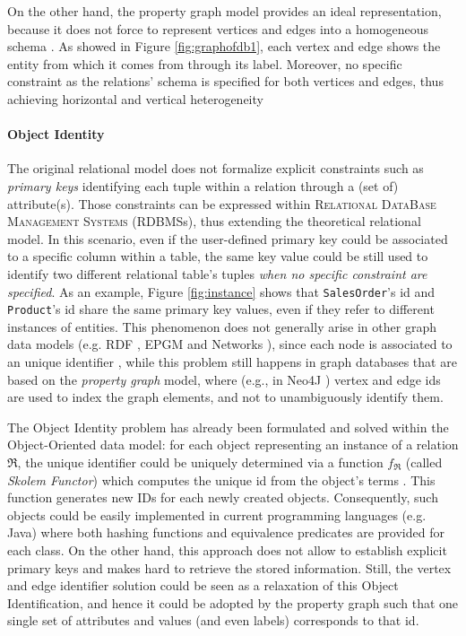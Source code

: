 On the other hand, the property graph model provides an ideal representation, because it does not force to represent vertices and edges into a homogeneous schema \cite{Vasilyeva13}. As showed in Figure \ref{fig:graphofdb1}, each vertex and edge shows the entity from which it comes from through its label. Moreover, no specific constraint as the relations' schema is specified for both vertices and edges, thus achieving horizontal and vertical heterogeneity

\paragraph*{Object Identity}\label{sec:objid}
The original relational model does not formalize explicit constraints such as \textit{primary keys} identifying each tuple within a relation through a (set of) attribute(s). Those constraints can be expressed within \textsc{Relational DataBase Management Systems} (RDBMSs), thus extending the theoretical relational model. In this scenario, even if the user-defined primary key could be associated to a specific column within a table, the same key value could be still used to identify two different relational table's tuples \textit{when no specific constraint are specified}. As an example, Figure \ref{fig:instance} shows that \texttt{SalesOrder}'s id and \texttt{Product}'s id share the same primary key values, even if they refer to different instances of entities. This phenomenon does not generally arise in other graph data models (e.g. RDF \cite{Allemang2011}, EPGM \cite{apacheflink}
and Networks \cite{Johnson2011}), since each node is associated to an unique identifier \cite{GutierrezInclusion}, while this problem still
happens in graph databases that are based on the \textit{property graph} model, where (e.g., in Neo4J \cite{Neo4jAlg}) vertex and edge ids are used to index the graph elements, and not to unambiguously identify them. 

The Object Identity problem has already been formulated and solved within the Object-Oriented data model: for each object
representing an instance of a relation $\Re$, the unique identifier could be uniquely determined via a function $f_\Re$ 
(called \textit{Skolem Functor}\label{skolem}) which computes the unique id from the object's terms \cite{Cabibbo}. This function
generates new IDs for each newly created objects. Consequently, such objects could be easily implemented
in current programming languages (e.g. Java) where both hashing functions and equivalence predicates are provided for
each class. On the other hand, this approach does not allow to establish explicit primary keys and makes hard to retrieve the stored information. Still, the vertex and edge identifier solution could be seen as a relaxation of this Object Identification, and hence it could be adopted by the property graph such that one single set of attributes and values (and even labels) corresponds to that id.


